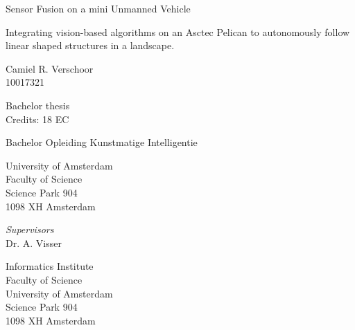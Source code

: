 \documentclass[a4paper,pdf]{article}
\begin{document}
\begin{center}

\vspace{2.5cm}

\begin{Large}
Sensor Fusion on a mini Unmanned Vehicle\\
\end{Large}
Integrating vision-based algorithms on an Asctec Pelican to autonomously follow linear shaped structures in a landscape.

\vspace{1.5cm}

Camiel R. Verschoor\\
10017321

\vspace{1.5cm}

Bachelor thesis\\
Credits: 18 EC

\vspace{0.5cm}

Bachelor Opleiding Kunstmatige Intelligentie

\vspace{0.25cm}

University of Amsterdam\\
Faculty of Science\\
Science Park 904\\
1098 XH Amsterdam

\vspace{4cm}

\emph{Supervisors}\\
Dr. A. Visser

\vspace{0.25cm}

Informatics Institute\\
Faculty of Science\\
University of Amsterdam\\
Science Park 904\\
1098 XH  Amsterdam


\end{center}
\end{document}
